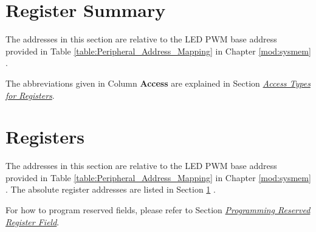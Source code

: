 \documentclass[main\_\_EN.tex]{subfiles}
\begin{document}
\hypertarget{ledpwm-reg-summ}{}
\section{Register Summary}\label{sec:ledpwm-reg-summ}

The addresses in this section are relative to the LED PWM base address provided in Table \ref{table:Peripheral_Address_Mapping} in Chapter \ref{mod:sysmem} \textit{}.

The abbreviations given in Column \textbf{Access} are explained in Section \hyperref[glossary-access-types]{\textit{Access Types for Registers}}.



{\clearpage}

\section{Registers}

The addresses in this section are relative to the LED PWM base address provided in Table \ref{table:Peripheral_Address_Mapping} in Chapter \ref{mod:sysmem} \textit{}. The absolute register addresses are listed in Section \ref{sec:ledpwm-reg-summ} \textit{}. 

For how to program reserved fields, please refer to Section \hyperref[programming-reserved-field]{\textit{Programming Reserved Register Field}}.



\end{document}
